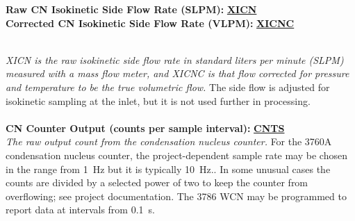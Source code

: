 \begin{hangparagraphs}
\noindent\begin{minipage}[t]{1\columnwidth}%
\textbf{Raw CN Isokinetic Side Flow Rate (SLPM):}\textbf{
}\textbf{\uline{XICN}}\\
\textbf{Corrected CN Isokinetic Side Flow Rate (VLPM):}\textbf{
}\textbf{\uline{XICNC}}\textbf{\uline{}}%
\end{minipage}\\
\emph{XICN is the raw isokinetic side flow rate in standard liters
per minute (SLPM) measured with a mass flow meter, and XICNC is that
flow corrected for pressure and temperature to be the true volumetric
flow.} The side flow is adjusted for
isokinetic sampling at the inlet, but it is not used further in processing.
\\
\\

\textbf{CN Counter Output (counts per sample interval):}\textbf{
}\textbf{\uline{CNTS}}\\
\emph{The raw output count from the condensation nucleus counter.}
For the 3760A condensation nucleus counter, the project-dependent
sample rate may be chosen in the range from 1~Hz but
it is typically 10~Hz.. In some unusual cases the counts are divided
by a selected power of two to keep the counter from overflowing; see
project documentation. The 3786 WCN may be programmed to report data
at intervals from 0.1~s.\label{punch:7-1}


\end{hangparagraphs}

